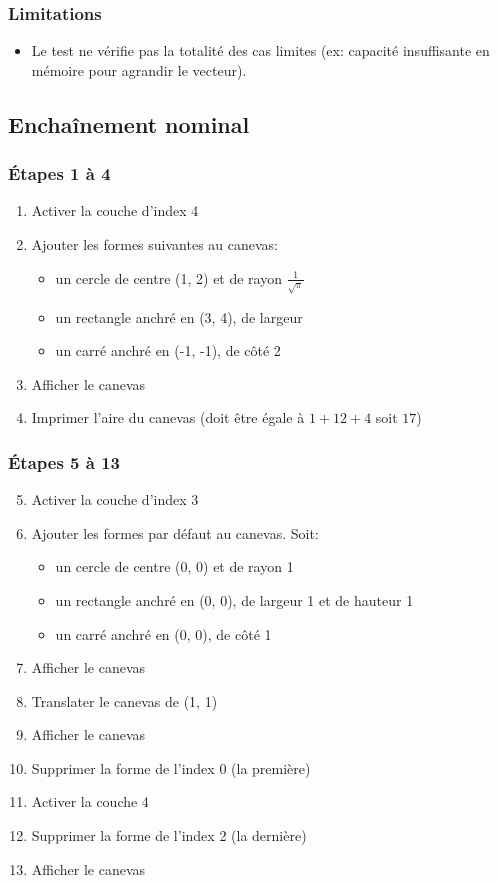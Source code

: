 \documentclass[a11paper, 11pt]{article}
\begin{document}
\subsubsection{Limitations}

\begin{itemize}
  \item Le test ne vérifie pas la totalité des cas limites
    (ex: capacité insuffisante en mémoire pour agrandir le vecteur).
\end{itemize}


\subsection{Enchaînement nominal}

\subsubsection{Étapes 1 à 4}
\begin{enumerate}
  \item Activer la couche d'index 4
  \item Ajouter les formes suivantes au canevas:
    \begin{itemize}
      \item un cercle de centre (1, 2) et de rayon $\frac{1}{\sqrt{\pi}}$
      \item un rectangle anchré en (3, 4), de largeur
      \item un carré anchré en (-1, -1), de côté 2
    \end{itemize}
  \item Afficher le canevas
  \item Imprimer l'aire du canevas (doit être égale à $1+12+4$ soit $17$)
\end{enumerate}

\subsubsection{Étapes 5 à 13}
\begin{enumerate}
  \setcounter{enumi}{4}
  \item Activer la couche d'index 3
  \item Ajouter les formes par défaut au canevas. Soit:
  \begin{itemize}
    \item un cercle de centre (0, 0) et de rayon 1
    \item un rectangle anchré en (0, 0), de largeur 1 et de hauteur 1
    \item un carré anchré en (0, 0), de côté 1
  \end{itemize}
  \item Afficher le canevas
  \item Translater le canevas de (1, 1)
  \item Afficher le canevas
  \item Supprimer la forme de l'index 0 (la première)
  \item Activer la couche 4
  \item Supprimer la forme de l'index 2 (la dernière)
  \item Afficher le canevas
\end{enumerate}
\end{document}
